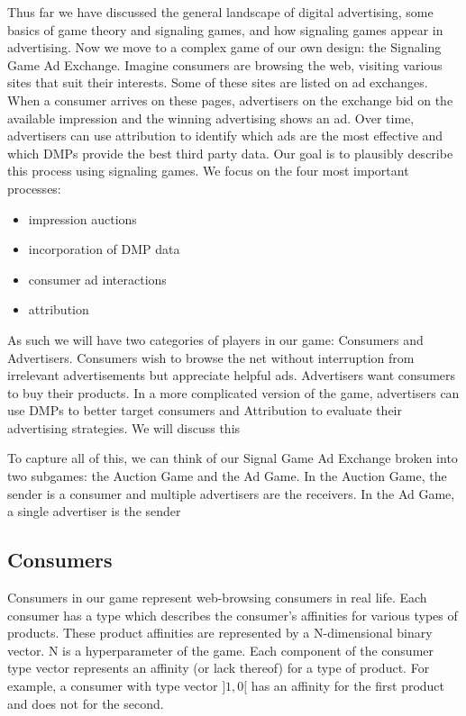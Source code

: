 \documentclass{article}
\begin{document}
Thus far we have discussed the general landscape of digital advertising, some basics of game theory and signaling games, and how signaling games appear in advertising. Now we move to a complex game of our own design: the Signaling Game Ad Exchange. Imagine consumers are browsing the web, visiting various sites that suit their interests. Some of these sites are listed on ad exchanges. When a consumer arrives on these pages, advertisers on the exchange bid on the available impression and the winning advertising shows an ad. Over time, advertisers can use attribution to identify which ads are the most effective and which DMPs provide the best third party data. Our goal is to plausibly describe this process using signaling games. We focus on the four most important processes:

\begin{itemize}
	\item impression auctions
	\item incorporation of DMP data
	\item consumer ad interactions
	\item attribution
\end{itemize}

As such we will have two categories of players in our game: Consumers and Advertisers. Consumers wish to browse the net without interruption from irrelevant advertisements but appreciate helpful ads. Advertisers want consumers to buy their products. In a more complicated version of the game, advertisers can use DMPs to better target consumers and Attribution to evaluate their advertising strategies. We will discuss this 

To capture all of this, we can think of our Signal Game Ad Exchange broken into two subgames: the Auction Game and the Ad Game. In the Auction Game, the sender is a consumer and multiple advertisers are the receivers. In the Ad Game, a single advertiser is the sender 

\subsection{Consumers}

Consumers in our game represent web-browsing consumers in real life. Each consumer has a type which describes the consumer's affinities for various types of products. These product affinities are represented by a N-dimensional binary vector. N is a hyperparameter of the game. Each component of the consumer type vector represents an affinity (or lack thereof) for a type of product. For example, a consumer with type vector $\rbrack 1, 0 \lbrack$ has an affinity for the first product and does not for the second.
\end{document}
